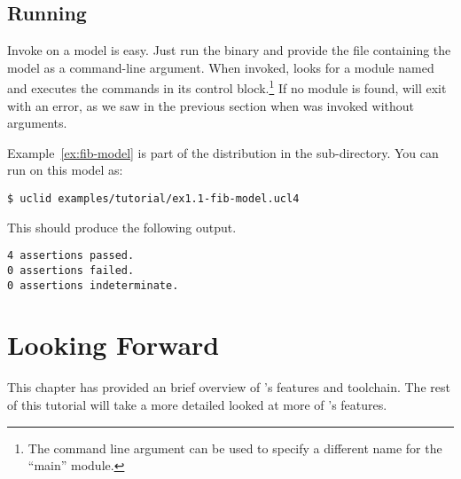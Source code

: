 \subsection{Running \uclid{}}

Invoke \uclid{} on a model is easy. Just run the  binary and provide the file containing the model as a command-line argument. When invoked, \uclid{} looks for a module named  and executes the commands in its control block.\footnote{The  command line argument can be used to specify a different name for the ``main'' module.} If no  module is found, \uclid{} will exit with an error, as we saw in the previous section when  was invoked without arguments.

Example~\ref{ex:fib-model} is part of the \uclid{} distribution in the  sub-directory. You can run \uclid{} on this model as:

\begin{verbatim}
$ uclid examples/tutorial/ex1.1-fib-model.ucl4 
\end{verbatim}

This should produce the following output.
\begin{Verbatim}[frame=single, samepage=true]
4 assertions passed.
0 assertions failed.
0 assertions indeterminate.
\end{Verbatim}

\section{Looking Forward}
This chapter has provided an brief overview of \uclid{}'s features and toolchain. The rest of this tutorial will take a more detailed looked at more of \uclid{}'s features.
